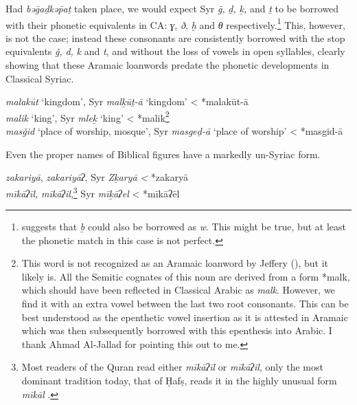\documentclass[output=paper]{langsci/langscibook}
\begin{document}
Had \textit{bəḡaḏkə\={p}aṯ} taken place, we would expect Syr \textit{ḡ,} \textit{ḏ,} \textit{ḵ,} and \textit{ṯ} to be borrowed with their phonetic equivalents in CA: \textit{ɣ}, \textit{ð}, \textit{ḫ} and \textit{θ} respectively.\footnote{\cite{Retsö2011} suggests that \textit{ḇ} could also be borrowed as \textit{w}. This might be true, but at least the phonetic match in this case is not perfect.} This, however, is not the case; instead these consonants are consistently borrowed with the stop equivalents \textit{ǧ,} \textit{d,} \textit{k} and \textit{t}, and without the loss of vowels in open syllables, clearly showing that these Aramaic loanwords predate the phonetic developments in Classical Syriac.

\ea
\ea\textit{malakūt} ‘kingdom’, Syr \textit{malḵūṯ-ā} ‘kingdom’ < *malakūt-ā\\
\ex\textit{malik} ‘king’, Syr \textit{mleḵ} ‘king’ < *malik\footnote{This word is not recognized as an Aramaic loanword by Jeffery (\citeyear[270]{Jeffrey2007}), but it likely is. All the Semitic cognates of this noun are derived from a form *malk, which should have been reflected in Classical Arabic as \textit{malk}. However, we find it with an extra vowel between the last two root consonants. This can be best understood as the epenthetic vowel insertion as it is attested in Aramaic which was then subsequently borrowed with this epenthesis into Arabic. I thank Ahmad Al-Jallad for pointing this out to me.}\\
\ex\textit{masǧid} ‘place of worship, mosque’, Syr \textit{masgeḏ-ā} ‘place of worship’ < *masgid-ā
\z
\z

Even the proper names of Biblical figures have a markedly un-Syriac form.

\ea
\ea\textit{zakariyā}, \textit{zakariyāʔ}, Syr \textit{Zḵaryā} \textit{<} *zakaryā\\
\ex\textit{mīkāʔīl,} \textit{mīkāʔil},\footnote{Most readers of the Quran read either \textit{mīkāʔīl} or \textit{mīkāʔil}, only the most dominant tradition today, that of Ḥafṣ, reads it in the highly unusual form \textit{mīkāl} \citep[166]{IbnMujahid}.} Syr \textit{mīḵāʔel} < *mīkāʔēl
\z
\z
\end{document}
